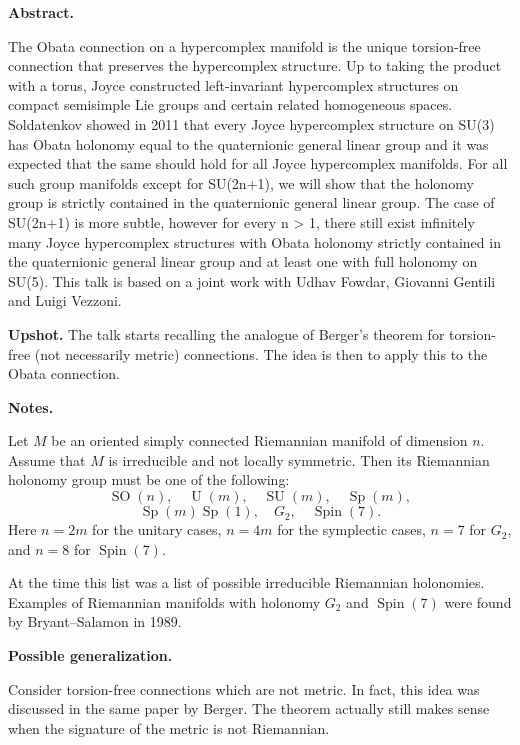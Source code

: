 \medskip\noindent
{\bf Abstract.}

The Obata connection on a hypercomplex
manifold is the unique torsion-free
connection that preserves the
hypercomplex structure. Up to taking
the product with a torus, Joyce
constructed left-invariant
hypercomplex structures on compact
semisimple Lie groups and certain
related homogeneous spaces.
Soldatenkov showed in 2011 that every
Joyce hypercomplex structure on SU(3)
has Obata holonomy equal to the
quaternionic general linear group and
it was expected that the same should
hold for all Joyce hypercomplex
manifolds. For all such group
manifolds except for SU(2n+1), we
will show that the holonomy group is
strictly contained in the quaternionic
general linear group. The case of
SU(2n+1) is more subtle, however for
every n > 1, there still exist
infinitely many Joyce hypercomplex
structures with Obata holonomy
strictly contained in the quaternionic
general linear group and at least one
with full holonomy on SU(5). This talk
is based on a joint work with Udhav
Fowdar, Giovanni Gentili and Luigi
Vezzoni.

\medskip\noindent
{\bf Upshot.} 
The talk starts recalling the analogue
of Berger's theorem for torsion-free
(not necessarily metric) connections.
The idea is then to apply this to the
Obata connection.

\medskip\noindent
{\bf Notes.}

\begin{theorem}[Berger]
\label{theorem-let-m2}
Let $M$ be an oriented simply
connected Riemannian manifold of
dimension $n$.
Assume that $M$ is irreducible and
not locally symmetric.
Then its Riemannian holonomy group
must be one of the following:
\[
\operatorname{SO}(n),\quad
\operatorname{U}(m),\quad
\operatorname{SU}(m),\quad
\operatorname{Sp}(m),
\]
\[
\operatorname{Sp}(m)\operatorname{Sp}(1),
\quad
G_2,\quad
\operatorname{Spin}(7).
\]
Here $n=2m$ for the unitary cases,
$n=4m$ for the symplectic cases,
$n=7$ for $G_2$, and $n=8$ for
$\operatorname{Spin}(7)$.
\end{theorem}

At the time this list was a list of
possible irreducible Riemannian
holonomies.
Examples of Riemannian manifolds with
holonomy $G_2$ and
$\operatorname{Spin}(7)$ were found
by Bryant--Salamon in 1989.

\medskip\noindent
{\bf Possible generalization.}

Consider torsion-free connections
which are not metric.
In fact, this idea was discussed in
the same paper by Berger.
The theorem actually still makes sense
when the signature of the metric is
not Riemannian.

